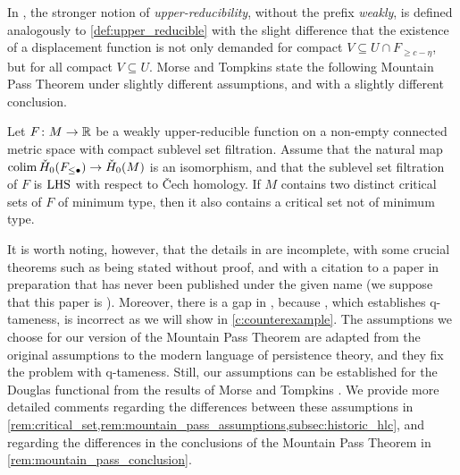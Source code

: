 In \cite[p.~36]{Morse.1938}, the stronger notion of \emph{upper-reducibility}, without the prefix \emph{weakly}, is defined analogously to \cref{def:upper_reducible} with the slight difference that the existence of a displacement function is not only demanded for compact $V \subseteq U \cap F_{\geq c - \eta}$, but for all compact $V \subseteq U$.
Morse and Tompkins state the following Mountain Pass Theorem under slightly different assumptions, and with a slightly different conclusion.


\begin{thm}
\label{thm:mountain_pass}
	Let $F \colon M \to \mathbb{R}$ be a weakly upper-reducible function on a non-empty connected metric space with compact sublevel set filtration.
	Assume that the natural map $\operatorname*{colim} \check{H}_0(F_{\leq \bullet}) \to \check{H}_0(M)$ is an isomorphism, and that the sublevel set filtration of $F$ is $\mathrm{LHS}$ with respect to \v Cech homology.
	If $M$ contains two distinct critical sets of $F$ of minimum type, then it also contains a critical set not of minimum type.
\end{thm}

It is worth noting, however, that the details in \cite{Morse.1939} are incomplete, with some crucial theorems such as \cite[Theorems 7.3 and 7.4, Corollary 7.1]{Morse.1939} being stated without proof, and with a citation to a paper in preparation that has never been published under the given name (we suppose that this paper is \cite{Morse.1940}).
Moreover, there is a gap in \cite{Morse.1940}, because \cite[Theorem 6.3]{Morse.1940}, which establishes q-tameness, is incorrect as we will show in \cref{c:counterexample}.
The assumptions we choose for our version of the Mountain Pass Theorem are adapted from the original assumptions to the modern language of persistence theory, and they fix the problem with q-tameness.
Still, our assumptions can be established for the Douglas functional from the results of Morse and Tompkins \cite{Morse.1939}.
We provide more detailed comments regarding the differences between these assumptions in \cref{rem:critical_set,rem:mountain_pass_assumptions,subsec:historic_hlc}, and regarding the differences in the conclusions of the Mountain Pass Theorem in \cref{rem:mountain_pass_conclusion}.

